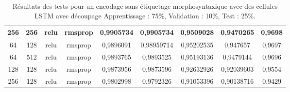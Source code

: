 \begin{table}[H]
{\begin{tabular}{|c|c|c|c|c|c|c|c|c|}
				256 & 256 & relu & rmsprop & 0,9905734 & 0,9905734 & 0,9509028 & 0,9470265 & 0,9698 \\ \hline
				64 & 128 & relu & rmsprop & 0,9896091 & 0,98959714 & 0,95202535 & 0,947657 & 0,9697 \\ \hline
				64 & 512 & relu & rmsprop & 0,9893765 & 0,9893525 & 0,95193136 & 0,9479144 & 0,9696 \\ \hline
				128 & 128 & relu & rmsprop & 0,9873956 & 0,9873596 & 0,92632926 & 0,92039603 & 0,9554 \\ \hline
				256 & 128 & relu & rmsprop & 0,9802998 & 0,9792326 & 0,91053396 & 0,90138716 & 0,9429 \\ \hline
			\end{tabular}%
		}
		\caption{Résultats des tests pour un encodage sans étiquetage morphosyntaxique avec des cellules LSTM avec découpage Apprentissage : 75\%, Validation : 10\%, Test : 25\%.}
		\label{tab:lstm_3}
	\end{table}
	
